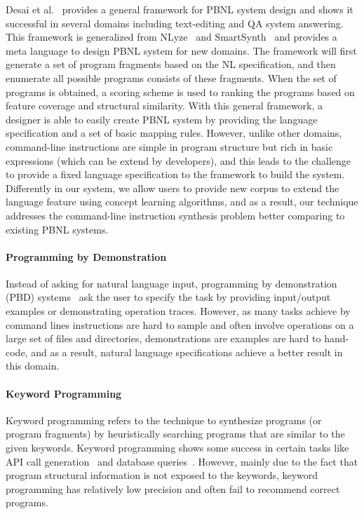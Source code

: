 Desai et al.~\cite{DBLP:journals/corr/DesaiGHJKMRR15} provides a general framework for PBNL system design and shows it successful in several domains including text-editing and QA system answering. This framework is generalized from NLyze~\cite{DBLP:conf/sigmod/GulwaniM14} and SmartSynth~\cite{DBLP:conf/mobisys/LeGS13} and provides a meta language to design PBNL system for new domains. The framework will first generate a set of program fragments based on the NL specification, and then enumerate all possible programs consists of these fragments. When the set of programs is obtained, a scoring scheme is used to ranking the programs based on feature coverage and structural similarity. With this general framework, a designer is able to easily create PBNL system by providing the language specification and a set of basic mapping rules. However, unlike other domains, command-line instructions are simple in program structure but rich in basic expressions (which can be extend by developers), and this leads to the challenge to provide a fixed language specification to the framework to build the system. Differently in our system, we allow users to provide new corpus to extend the language feature using concept learning algorithms, and as a result, our technique addresses the command-line instruction synthesis problem better comparing to existing PBNL systems.

\paragraph{Programming by Demonstration} Instead of asking for natural language input, programming by demonstration (PBD) systems~\cite{DBLP:journals/ml/LauWDW03, DBLP:journals/cacm/GulwaniHS12, DBLP:conf/pldi/HarrisG11, DBLP:conf/popl/Gulwani11} ask the user to specify the task by providing input/output examples or demonstrating operation traces. However, as many tasks achieve by command lines instructions are hard to sample and often involve operations on a large set of files and directories, demonstrations are examples are hard to hand-code, and as a result, natural language specifications achieve a better result in this domain.

\paragraph{Keyword Programming} Keyword programming refers to the technique to synthesize programs (or program fragments) by heuristically searching programs that are similar to the given keywords. Keyword programming shows some success in certain tasks like API call generation~\cite{DBLP:journals/ase/LittleM09, DBLP:conf/pldi/MandelinXBK05} and database queries~\cite{DBLP:conf/icde/AgrawalCD02, DBLP:conf/icde/BhalotiaHNCS02}. However, mainly due to the fact that program structural information is not exposed to the keywords, keyword programming has relatively low precision and often fail to recommend correct programs.

